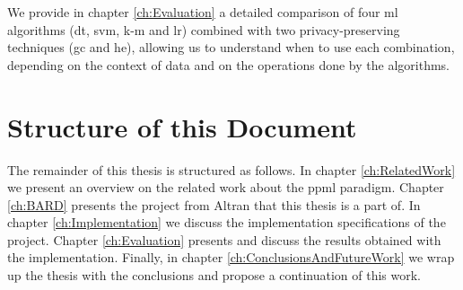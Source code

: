 We provide in chapter \ref{ch:Evaluation} a detailed comparison of four \ac{ml} algorithms (\ac{dt}, \ac{svm}, \ac{k-m} and \ac{lr}) combined with two privacy-preserving techniques (\ac{gc} and \ac{he}), allowing us to understand when to use each combination, depending on the context of data and on the operations done by the algorithms.





\section{Structure of this Document}
\label{sec:Intro_StructureOfThisDocument}
The remainder of this thesis is structured as follows.
In chapter \ref{ch:RelatedWork} we present an overview on the related work about the \ac{ppml} paradigm.
Chapter \ref{ch:BARD} presents the project from Altran that this thesis is a part of.
In chapter \ref{ch:Implementation} we discuss the implementation specifications of the project.
Chapter \ref{ch:Evaluation} presents and discuss the results obtained with the implementation.
Finally, in chapter \ref{ch:ConclusionsAndFutureWork} we wrap up the thesis with the conclusions and propose a continuation of this work.

